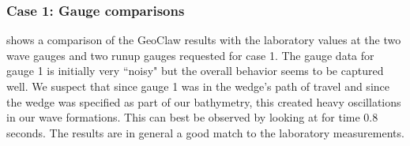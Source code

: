 \subsubsection{Case 1: Gauge comparisons}

 shows a comparison of the GeoClaw results with the
laboratory values at the two wave gauges and two runup gauges requested
for case 1.  The gauge data for gauge 1 is initially very ``noisy" but the overall
behavior seems to be captured well.  We suspect that since gauge 1 was in
the wedge's path of travel and since the wedge was specified as part of our
bathymetry, this created heavy oscillations in our wave formations.  This can
best be observed by looking at  for time 0.8 seconds.
The results are in general a good match to the laboratory measurements.

